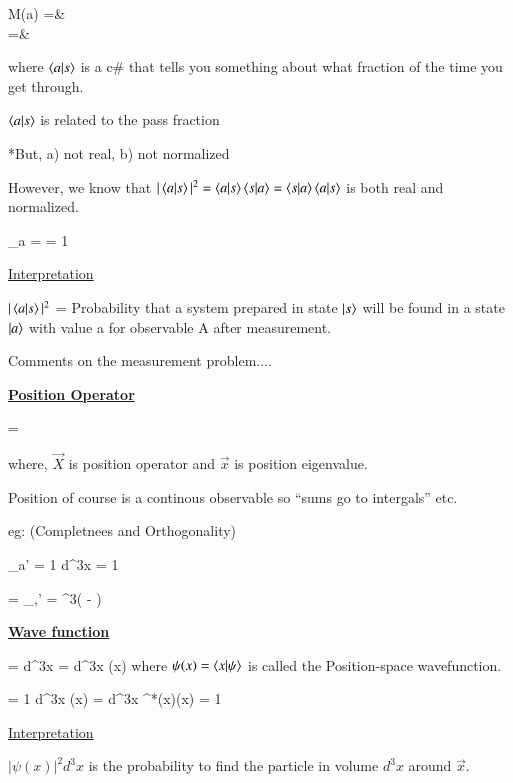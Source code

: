 {\bea
M(a) =& \\
            =& 
\eea

where $\braket{a|s}$ is a c\# that tells you something about what fraction of the time you get through. 


$\braket{a|s}$ is related to the pass fraction

*But, a) not real,  b) not normalized

However, we know that $|\braket{a|s}|^2 = \braket{a|s}\braket{s|a} = \braket{s|a}\braket{a|s}$
is both real and normalized. 

\be
\sum\limits_{a}  =  = 1
\ee

\underline{Interpretation}

$|\braket{a|s}|^2$ = Probability that a system prepared in state $\ket{s}$ will be found in a state $\ket{a}$ with value a for observable A after measurement. 


Comments on the measurement problem....


\clearpage

\textbf{\underline{Position Operator}}

\be
{}  = 
\ee

where, $\vec{X}$ is position operator and $\vec{x}$ is position eigenvalue.

Position of course is a continous observable so ``sums go to intergals'' etc.

eg: (Completnees and Orthogonality)

\be
\sum\limits_{a'}  = 1   \Rightarrow \int d^3x  = 1
\ee

\be
{} = \delta_{\alpha,\alpha'}   \Rightarrow {} = \delta^3( - )
\ee


\textbf{\underline{Wave function}}

\be
\ket{\psi} = \int d^3x  = \int d^3x \psi(x)
\ee
where $\psi(x) = \braket{x|\psi}$ is called the Position-space wavefunction.

\be
\braket{\psi|\psi} = 1  \Rightarrow \int d^3x \psi(x) = \int d^3x \psi^*(x)\psi(x) = 1
\ee

\underline{Interpretation}

 $|\psi(x)|^2d^3x$ is the probability to find the particle in volume $d^3x$ around $\vec{x}$.


\clearpage

}
